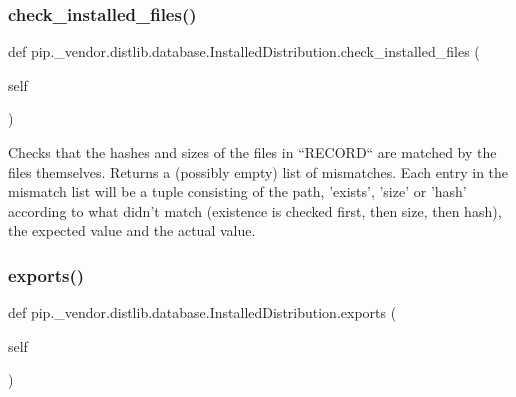 \mbox{\label{classpip_1_1__vendor_1_1distlib_1_1database_1_1InstalledDistribution_af02e7290aefa70861a60fe1885285e16}} 
\subsubsection{\texorpdfstring{check\+\_\+installed\+\_\+files()}{check\_installed\_files()}}
{\footnotesize\ttfamily def pip.\+\_\+vendor.\+distlib.\+database.\+Installed\+Distribution.\+check\+\_\+installed\+\_\+files (\begin{DoxyParamCaption}\item[{}]{self }\end{DoxyParamCaption})}

\begin{DoxyVerb}Checks that the hashes and sizes of the files in ``RECORD`` are
matched by the files themselves. Returns a (possibly empty) list of
mismatches. Each entry in the mismatch list will be a tuple consisting
of the path, 'exists', 'size' or 'hash' according to what didn't match
(existence is checked first, then size, then hash), the expected
value and the actual value.
\end{DoxyVerb}
 \mbox{\label{classpip_1_1__vendor_1_1distlib_1_1database_1_1InstalledDistribution_ab6c8a611e941b5927549bb03bb0a780b}} 
\subsubsection{\texorpdfstring{exports()}{exports()}}
{\footnotesize\ttfamily def pip.\+\_\+vendor.\+distlib.\+database.\+Installed\+Distribution.\+exports (\begin{DoxyParamCaption}\item[{}]{self }\end{DoxyParamCaption})}

